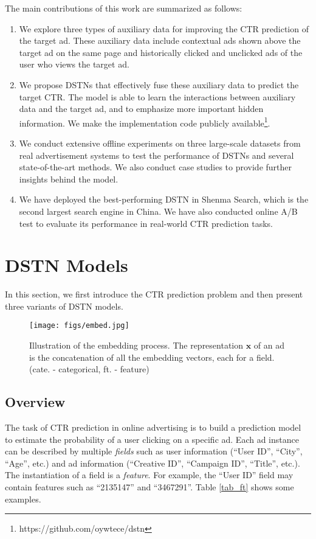 \documentclass[sigconf]{acmart}
\begin{document}
The main contributions of this work are summarized as follows:
\begin{enumerate}
\item We explore three types of auxiliary data for improving the CTR prediction of the target ad. These auxiliary data include contextual ads shown above the target ad on the same page and historically clicked and unclicked ads of the user who views the target ad.
\item We propose DSTNs that effectively fuse these auxiliary data to predict the target CTR. The model is able to learn the interactions between auxiliary data and the target ad, and to emphasize more important hidden information. We make the implementation code publicly available\footnote{https://github.com/oywtece/dstn}.
\item We conduct extensive offline experiments on three large-scale datasets from real advertisement systems to test the performance of DSTNs and several state-of-the-art methods. We also conduct case studies to provide further insights behind the model.
\item We have deployed the best-performing DSTN in Shenma Search, which is the second largest search engine in China. We have also conducted online A/B test to evaluate its performance in real-world CTR prediction tasks.
\end{enumerate}

\section{DSTN Models}
In this section, we first introduce the CTR prediction problem and then present three variants of DSTN models.

\begin{figure}[!t]
\centering
\texttt{[image: figs/embed.jpg]}
\vskip -8pt
\caption{Illustration of the embedding process. The representation $\mathbf{x}$ of an ad is the concatenation of all the embedding vectors, each for a field. (cate. - categorical, ft. - feature)}
\vskip -12pt
\label{embed}
\end{figure}

\subsection{Overview}
The task of CTR prediction in online advertising is to build a prediction model to estimate the probability of a user clicking on a specific ad.
Each ad instance can be described by multiple \emph{fields} such as user information (``User ID'', ``City'', ``Age'', etc.) and ad information (``Creative ID'', ``Campaign ID'', ``Title'', etc.). The instantiation of a field is a \emph{feature}. For example, the ``User ID'' field may contain features such as ``2135147'' and ``3467291''. Table \ref{tab_ft} shows some examples.
\end{document}
